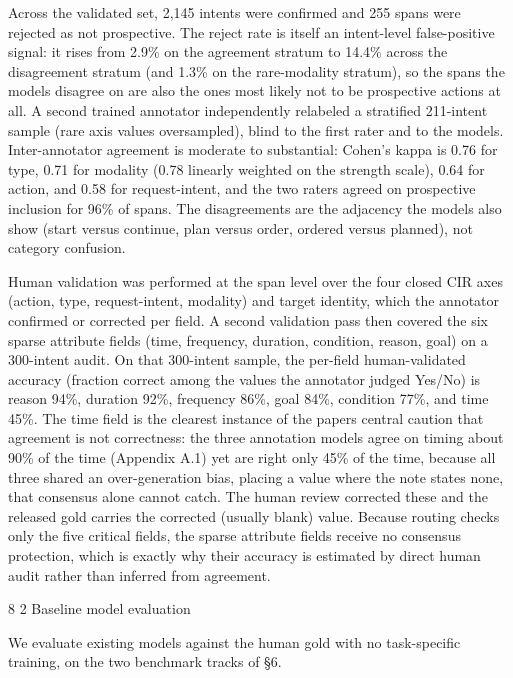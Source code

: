 \documentclass[3p,twocolumn]{elsarticle}
\makeatletter
\renewcommand\subsection{\@startsection{subsection}{2}{\z@}%
    {8\p@ \@plus 4\p@ \@minus 4\p@}%
    {2\p@ \@plus 4\p@ \@minus 3\p@}%
    {\normalfont\normalsize\itshape}}
\makeatother
\begin{document}
Across the validated set, 2,145 intents were confirmed and 255 spans were rejected as not prospective. The reject rate is itself an intent-level false-positive signal: it rises from 2.9\% on the agreement stratum to 14.4\% across the disagreement stratum (and 1.3\% on the rare-modality stratum), so the spans the models disagree on are also the ones most likely not to be prospective actions at all. A second trained annotator independently relabeled a stratified 211-intent sample (rare axis values oversampled), blind to the first rater and to the models. Inter-annotator agreement is moderate to substantial: Cohen's kappa is 0.76 for type, 0.71 for modality (0.78 linearly weighted on the strength scale), 0.64 for action, and 0.58 for request-intent, and the two raters agreed on prospective inclusion for 96\% of spans. The disagreements are the adjacency the models also show (start versus continue, plan versus order, ordered versus planned), not category confusion.

Human validation was performed at the span level over the four closed CIR axes (action, type, request-intent, modality) and target identity, which the annotator confirmed or corrected per field. A second validation pass then covered the six sparse attribute fields (time, frequency, duration, condition, reason, goal) on a 300-intent audit. On that 300-intent sample, the per-field human-validated accuracy (fraction correct among the values the annotator judged Yes/No) is reason 94\%, duration 92\%, frequency 86\%, goal 84\%, condition 77\%, and time 45\%. The time field is the clearest instance of the paper\textquotesingle s central caution that agreement is not correctness: the three annotation models agree on timing about 90\% of the time (Appendix A.1) yet are right only 45\% of the time, because all three shared an over-generation bias, placing a value where the note states none, that consensus alone cannot catch. The human review corrected these and the released gold carries the corrected (usually blank) value. Because routing checks only the five critical fields, the sparse attribute fields receive no consensus protection, which is exactly why their accuracy is estimated by direct human audit rather than inferred from agreement.

\subsection{Baseline model evaluation}\label{baseline-model-evaluation}

We evaluate existing models against the human gold with no task-specific training, on the two benchmark tracks of §6.
\end{document}
